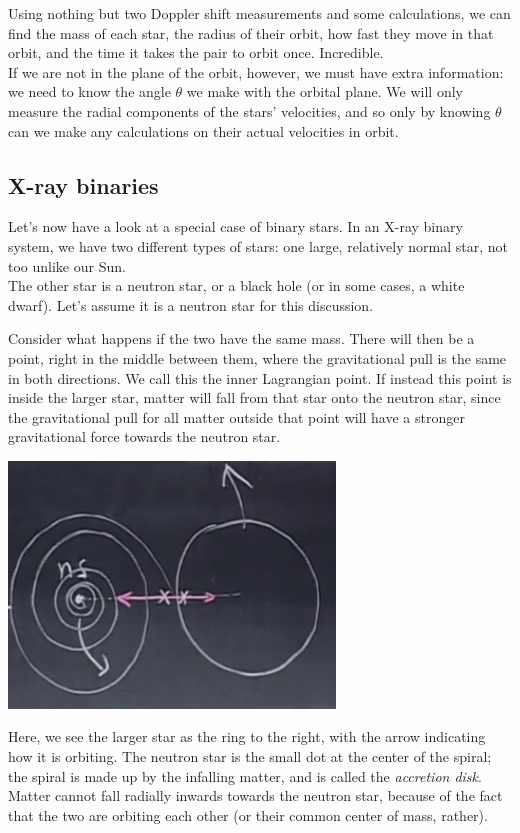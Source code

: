 \documentclass[8.01x]{subfiles}
\begin{document}
Using nothing but two Doppler shift measurements and some calculations, we can find the mass of each star, the radius of their orbit, how fast they move in that orbit, and the time it takes the pair to orbit once. Incredible.\\
If we are not in the plane of the orbit, however, we must have extra information: we need to know the angle $\theta$ we make with the orbital plane. We will only measure the radial components of the stars' velocities, and so only by knowing $\theta$ can we make any calculations on their actual velocities in orbit.

\subsection{X-ray binaries}

Let's now have a look at a special case of binary stars. In an X-ray binary system, we have two different types of stars: one large, relatively normal star, not too unlike our Sun.\\
The other star is a neutron star, or a black hole (or in some cases, a white dwarf). Let's assume it is a neutron star for this discussion.

Consider what happens if the two have the same mass. There will then be a point, right in the middle between them, where the gravitational pull is the same in both directions. We call this the inner Lagrangian point. If instead this point is inside the larger star, matter will fall from that star onto the neutron star, since the gravitational pull for all matter outside that point will have a stronger gravitational force towards the neutron star.

\begin{center}
\includegraphics[scale=0.6]{Graphics/lec23_xray_binary}
\end{center}

Here, we see the larger star as the ring to the right, with the arrow indicating how it is orbiting. The neutron star is the small dot at the center of the spiral; the spiral is made up by the infalling matter, and is called the \emph{accretion disk}. Matter cannot fall radially inwards towards the neutron star, because of the fact that the two are orbiting each other (or their common center of mass, rather).
\end{document}
